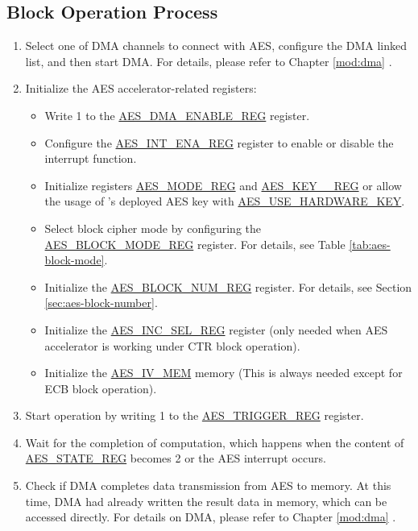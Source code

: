 \documentclass[main\_\_EN.tex]{subfiles}
\begin{document}
\subsection{Block Operation Process}
\begin{enumerate}
    \item Select one of DMA channels to connect with AES, configure the DMA linked list, and then start DMA. For details, please refer to Chapter \ref{mod:dma} \textit{}.
    \item Initialize the AES accelerator-related registers:
    \begin{itemize}
        \item Write 1 to the \hyperref[regdesc:AESDMAENABLEREG]{AES\_DMA\_ENABLE\_REG} register.
        \item Configure the \hyperref[regdesc:AESINTENAREG]{AES\_INT\_ENA\_REG} register to enable or disable the interrupt function.
        \item Initialize registers \hyperref[regdesc:AESMODEREG]{AES\_MODE\_REG} and \hyperref[regdesc:AESKEYNREG]{AES\_KEY\_\_REG} or allow the usage of 's deployed AES key with \hyperref[fielddesc:AESUSEHARDWAREKEY]{AES\_USE\_HARDWARE\_KEY}.
        \item Select block cipher mode by configuring the \hyperref[regdesc:AESBLOCKMODEREG]{AES\_BLOCK\_MODE\_REG} register. For details, see Table \ref{tab:aes-block-mode}.
        \item Initialize the \hyperref[regdesc:AESBLOCKNUMREG]{AES\_BLOCK\_NUM\_REG} register. For details, see Section \ref{sec:aes-block-number}.
        \item Initialize the \hyperref[regdesc:AESINCSELREG]{AES\_INC\_SEL\_REG} register (only needed when AES accelerator is working under CTR block operation).
        \item Initialize the \hyperref[memdesc:AESIVMEM]{AES\_IV\_MEM} memory (This is always needed except for ECB block operation).
    \end{itemize}
    \item Start operation by writing 1 to the \hyperref[regdesc:AESTRIGGERREG]{AES\_TRIGGER\_REG} register.
    \item \label{other:aes-block-computation-done} Wait for the completion of computation, which happens when the content of \hyperref[regdesc:AESSTATEREG]{AES\_STATE\_REG} becomes 2 or the AES interrupt occurs.
    \item Check if DMA completes data transmission from AES to memory. At this time, DMA had already written the result data in memory, which can be accessed directly. For details on DMA, please refer to Chapter \ref{mod:dma} \textit{}.

\end{enumerate}
\end{document}
